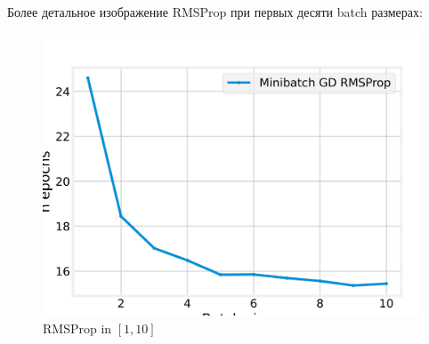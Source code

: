 \documentclass[12pt, a4paper, oneside, final]{article}
\begin{document}
	Более детальное изображение RMSProp при первых десяти batch размерах:
	\begin{figure}[H]
		\centering
		\includegraphics[scale = 0.9]{Image/T3_RMSPROP_1_10.png}
		\caption*{RMSProp in $[1, 10]$}
	\end{figure}
\end{document}

